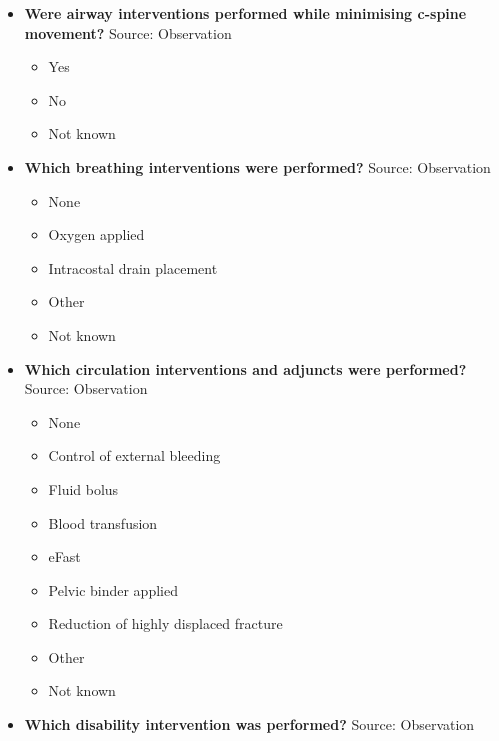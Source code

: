 \documentclass[
]{scrartcl}
\providecommand{\tightlist}{%
  \setlength{\itemsep}{0pt}\setlength{\parskip}{0pt}}\usepackage{longtable,booktabs,array}
\begin{document}
\begin{itemize}
  \begin{itemize}
  \tightlist
  \item
    None
  \item
    Manual airway procedure such as chin lift or jaw thrust
  \item
    Nasopharyngeal or Oropharyngeal airway inserted
  \item
    Supraglottic airway device
  \item
    Tracheal intubation
  \item
    Surgical airway
  \item
    Other
  \item
    Not known
  \end{itemize}
\item
  \textbf{Were airway interventions performed while minimising c-spine
  movement?} Source: Observation

  \begin{itemize}
  \tightlist
  \item
    Yes
  \item
    No
  \item
    Not known
  \end{itemize}
\item
  \textbf{Which breathing interventions were performed?} Source:
  Observation

  \begin{itemize}
  \tightlist
  \item
    None
  \item
    Oxygen applied
  \item
    Intracostal drain placement
  \item
    Other
  \item
    Not known
  \end{itemize}
\item
  \textbf{Which circulation interventions and adjuncts were performed?}
  Source: Observation

  \begin{itemize}
  \tightlist
  \item
    None
  \item
    Control of external bleeding
  \item
    Fluid bolus
  \item
    Blood transfusion
  \item
    eFast
  \item
    Pelvic binder applied
  \item
    Reduction of highly displaced fracture
  \item
    Other
  \item
    Not known
  \end{itemize}
\item
  \textbf{Which disability intervention was performed?} Source:
  Observation


\end{itemize}
\end{document}
